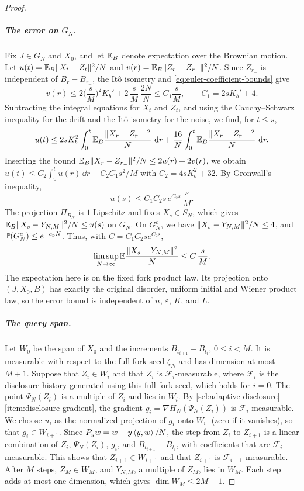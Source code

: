 \begin{proof}
\subparagraph{The error on $G_N$.}
Fix $J\in G_N$ and $X_0$, and let $\mathbb E_B$ denote expectation over the
Brownian motion. Let $u(t)=\mathbb E_B\lVert X_t-Z_t\rVert^2/N$ and
$v(r)=\mathbb E_B\lVert Z_r-Z_{r_-}\rVert^2/N$. Since $Z_{r_-}$ is independent of
$B_r-B_{r_-}$, the It\^o isometry and \eqref{eq:euler-coefficient-bounds}
give
\[
 v(r)\le2\Big(\frac sM\Big)^2K_b'+2\,\frac sM\,\frac{2N}N
 \le C_1\frac sM,\qquad C_1=2sK_b'+4.
\]
Subtracting the integral equations for $X_t$ and $Z_t$, and using the
Cauchy--Schwarz inequality for the drift and the It\^o isometry for the
noise, we find, for $t\le s$,
\[
 u(t)\le2sK_b^2\int_0^t\mathbb E_B\frac{\lVert X_r-Z_{r_-}\rVert^2}N\,\mathop{}\!\mathrm d r
 +\frac{16}N\int_0^t\mathbb E_B\frac{\lVert X_r-Z_{r_-}\rVert^2}N\,\mathop{}\!\mathrm d r.
\]
Inserting the bound $\mathbb E_B\lVert X_r-Z_{r_-}\rVert^2/N\le2u(r)+2v(r)$, we obtain
$u(t)\le C_2\int_0^tu(r)\,\dd r+C_2C_1s^2/M$ with $C_2=4sK_b^2+32$. By
Gronwall's inequality,
\[
 u(s)\le C_1C_2s\,e^{C_2s}\,\frac sM.
\]
The projection $\Pi_{B_N}$ is $1$-Lipschitz and fixes $X_s\in S_N$, which
gives
$\mathbb E_B\lVert X_s-Y_{N,M}\rVert^2/N\le u(s)$ on $G_N$. On $G_N^c$, we have
$\lVert X_s-Y_{N,M}\rVert^2/N\le4$, and $\mathbb P(G_N^c)\le e^{-c_pN}$. Thus, with $C=C_1C_2se^{C_2s}$,
\begin{equation}\label{sel:euler-approximation}
 \limsup_{N\to\infty}\mathbb E\frac{\lVert X_s-Y_{N,M}\rVert^2}N\le C\,\frac sM.
\end{equation}
The expectation here is on the fixed fork product law. Its projection
onto $(J,X_0,B)$ has exactly the original disorder, uniform initial and
Wiener product law, so the error bound is independent of $n$, $\varepsilon$,
$K$, and $L$.

\subparagraph{The query span.}
Let $W_0$ be the span of $X_0$ and the increments $B_{t_{i+1}}-B_{t_i}$,
$0\le i<M$. It is measurable with respect to the full fork seed $\zeta_N$ and has dimension at
most $M+1$. Suppose that $Z_i\in W_i$ and that $Z_i$ is
$\mathcal F_i$-measurable, where $\mathcal F_i$ is the disclosure history
generated using this full fork seed, which holds for $i=0$. The point $\Psi_N(Z_i)$
is a multiple of $Z_i$ and lies in $W_i$. By \cref{sel:adaptive-disclosure}\ref{item:disclosure-gradient}, the gradient
$g_i=\nabla H_N(\Psi_N(Z_i))$ is $\mathcal F_i$-measurable. We choose $u_i$
as the normalized projection of $g_i$ onto $W_i^\perp$ (zero if it
vanishes), so that $g_i\in W_{i+1}$. Since
$P_yw=w-y\left\langle y,w\right\rangle/N$, the step from $Z_i$ to $Z_{i+1}$ is a linear
combination of $Z_i$, $\Psi_N(Z_i)$, $g_i$, and $B_{t_{i+1}}-B_{t_i}$, with
coefficients that are $\mathcal F_i$-measurable. This shows that
$Z_{i+1}\in W_{i+1}$ and that $Z_{i+1}$ is $\mathcal F_{i+1}$-measurable. After $M$ steps, $Z_M\in W_M$,
and $Y_{N,M}$, a multiple of $Z_M$, lies in $W_M$. Each step adds at most
one dimension, which gives $\dim W_M\le2M+1$.


\end{proof}
